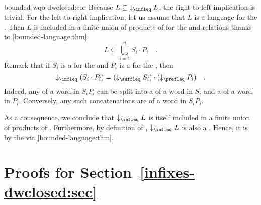\begin{proofof}{bounded-wqo-dwclosed:cor}
    Because $L \subseteq \dwset[\infleq]{L}$, the right-to-left implication
    is trivial.
    For the left-to-right implication, let us assume that $L$ is a
     language for the .
    Then $L$ is included in a finite union 
    of products of  for the  and  relations
    thanks to
    \cref{bounded-language:thm}:
    \begin{equation*}
        L \subseteq \bigcup_{i = 1}^n S_i \cdot P_i \quad .
    \end{equation*}
    Remark that if $S_i$ is a  for the 
    and $P_i$ is a  for the ,
    then 
    \begin{equation*}
      \dwset[\infleq]{(S_i \cdot P_i)} = (\dwset[\suffleq]{S_i}) \cdot (\dwset[\prefleq]{P_i})
        \quad .
    \end{equation*}
    Indeed, any  of a word in $S_i P_i$ can be split into
    a  of a word in $S_i$ and a  of a word in $P_i$.
    Conversely, any such concatenations are  of a word in $S_i P_i$.


    As a consequence, we conclude that $\dwset[\infleq]{L}$ is itself included
    in a finite union of products of .
    Furthermore, by definition of ,
    $\dwset[\infleq]{L}$ is also a .
    Hence, it is  by the  
    via
    \cref{bounded-language:thm}.
\end{proofof}


\clearpage
\section{Proofs for Section~\ref{infixes-dwclosed:sec}}

